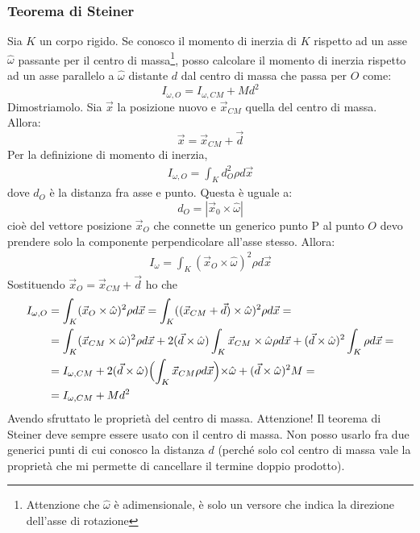 \documentclass[a4paper,openany]{article}
\begin{document}
	\subsubsection{Teorema di Steiner}
	Sia $K$ un corpo rigido. Se conosco il momento di inerzia di $K$ rispetto ad un asse $\hat{\omega}$ passante per il centro di massa\footnote{Attenzione che $\hat{\omega}$ è adimensionale, è solo un versore che indica la direzione dell'asse di rotazione}, posso calcolare il momento di inerzia rispetto ad un asse parallelo a $\hat{\omega}$ distante $d$ dal centro di massa che passa per $O$ come:
	$$
	I_{\omega,O} = I_{\omega, CM} + Md^{2}
	$$
	Dimostriamolo. Sia $\vec{x}$ la posizione nuovo e $\vec{x}_{CM}$ quella del centro di massa.
	Allora:
	$$
	\vec{x} = \vec{x}_{CM}+\vec{d}
	$$
	Per la definizione di momento di inerzia,
	\begin{equation}\label{key}
		\begin{aligned}
			I_{\omega,O} = \int_{K}d^2_O \rho d\vec{x}
		\end{aligned}
	\end{equation}
	dove $d_O$ è la distanza fra asse e punto. Questa è uguale a:
	$$
	d_O = |\vec{x}_{0}\times\hat{\omega}|
	$$
	cioè del vettore posizione $\vec{x}_O$ che connette un generico punto P al punto $O$ devo prendere solo la componente perpendicolare all'asse stesso. Allora:
	\begin{equation}\label{key}
		\begin{aligned}
			I_{\omega} = \int_{K}(\vec{x}_{O}\times\hat{\omega})^2 \rho d\vec{x}
		\end{aligned}
	\end{equation}
	Sostituendo $\vec{x}_O = \vec{x}_{CM}+\vec{d}$ ho che
	\begin{equation}\label{key}
		\begin{aligned}
			I_{\omega,O} &= \int_{K}(\vec{x}_{O}\times\hat{\omega})^2 \rho d\vec{x} = \int_{K}((\vec{x}_{CM}+\vec{d})\times\hat{\omega})^2 \rho d\vec{x} =  \\
			&= \int_{K}(\vec{x}_{CM}\times\hat\omega)^2\rho d\vec{x} + 2(\vec{d}\times\hat\omega)\int_{K}\vec{x}_{CM}\times\hat\omega\rho d\vec{x} +(\vec{d}\times\hat\omega)^2 \int_{K}\rho d\vec{x} = \\
			&= I_{\omega, CM} + 2(\vec{d}\times\hat\omega)\Bigl(\int_{K}\vec{x}_{CM}\rho d\vec{x}\Bigl) \times \hat\omega+ (\vec{d}\times\hat\omega)^2 M = \\
			&= I_{\omega, CM} + Md^2
		\end{aligned}
	\end{equation}
	Avendo sfruttato le proprietà del centro di massa. Attenzione! Il teorema di Steiner deve sempre essere usato con il centro di massa. Non posso usarlo fra due generici punti di cui conosco la distanza $d$ (perché solo col centro di massa vale la proprietà che mi permette di cancellare il termine doppio prodotto).
\end{document}
